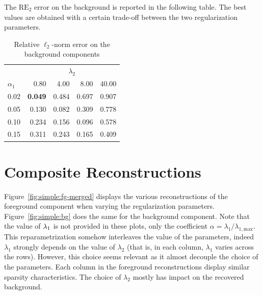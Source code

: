     The $\mathrm{RE}_2$ error on the background is reported in the following table. The best values are obtained with a certain trade-off between the two regularization parameters.  

    \begin{table}[h]
        \centering
        \begin{tabular}{l|rrrr}
            \toprule
             & \multicolumn{4}{c}{$\lambda_2$} \\
            \cmidrule(lr){2-5}
            $\alpha_1$ & 0.80 & 4.00 & 8.00 & 40.00 \\
            \midrule
            0.02 & \textbf{0.049} & 0.484 & 0.697 & 0.907 \\
            0.05 & 0.130 & 0.082 & 0.309 & 0.778 \\
            0.10 & 0.234 & 0.156 & 0.096 & 0.578 \\
            0.15 & 0.311 & 0.243 & 0.165 & 0.409 \\
            \bottomrule
        \end{tabular}
        \caption{Relative $\ell_2$-norm error on the background components \label{tab:rl2-bg}}
    \end{table}

    \vfill

\section{Composite Reconstructions}
    \label{app:reconstructions}


    Figure~\ref{fig:simple:fg-merged} displays the various reconstructions of the foreground component when varying the regularization parameters. Figure~\ref{fig:simple:bg} does the same for the background component. Note that the value of $\lambda_{1}$ is not provided in these plots, only the coefficient $\alpha = \lambda_1 / \lambda_{1, \mathrm{max}}$. This reparametrization somehow interleaves the value of the parameters, indeed $\lambda_1$ strongly depends on the value of $\lambda_2$ (that is, in each column, $\lambda_1$ varies across the rows). However, this choice seems relevant as it almost decouple the choice of the parameters. Each column in the foreground reconstructions display similar sparsity characteristics. The choice of $\lambda_2$ mostly has impact on the recovered background.

    \vfill

